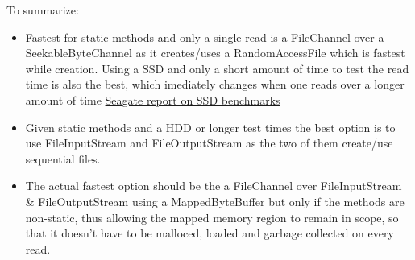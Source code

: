 \documentclass[a4paper]{article}
\begin{document}
\begin{enumerate}[a.]
            To summarize: 
            \begin{itemize}
                    \item Fastest for static methods and only a single read is a FileChannel over a SeekableByteChannel as it creates/uses a
                        RandomAccessFile which is fastest while creation. Using a SSD and only a short amount of time to test the read 
                        time is also the best, which imediately changes when one reads over a longer amount of time
                        \href{https://www.seagate.com/de/de/tech-insights/lies-damn-lies-and-ssd-benchmark-master-ti/}{Seagate report on SSD benchmarks}
                    \item Given static methods and a HDD or longer test times the best option is to use FileInputStream and FileOutputStream as
                        the two of them create/use sequential files.
                    \item The actual fastest option should be the a FileChannel over FileInputStream \& FileOutputStream using a MappedByteBuffer 
                        but only if the methods are non-static, thus allowing the mapped memory region to remain in scope, so that it doesn't have to 
                        be malloced, loaded and garbage collected on every read.
            \end{itemize}
        \end{enumerate}
\end{document}
